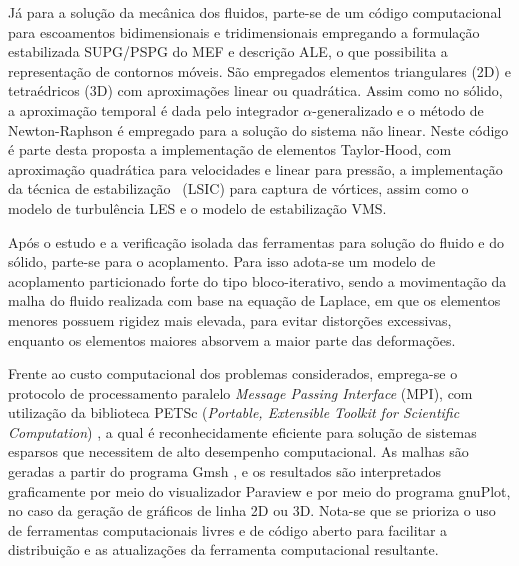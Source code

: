 Já para a solução da mecânica dos fluidos, parte-se de um código computacional para escoamentos bidimensionais e tridimensionais empregando a formulação estabilizada SUPG/PSPG do MEF e descrição ALE, o que possibilita a representação de contornos móveis. São empregados elementos triangulares (2D) e tetraédricos (3D) com aproximações linear ou quadrática. Assim como no sólido, a aproximação temporal é dada pelo integrador $\alpha$-generalizado e o método de Newton-Raphson é empregado para a solução do sistema não linear. Neste código é parte desta proposta a implementação de elementos Taylor-Hood, com aproximação quadrática para velocidades e linear para pressão, a implementação da técnica de estabilização \LSIC\ (LSIC) para captura de vórtices, assim como o modelo de turbulência LES e o modelo de estabilização VMS.

Após o estudo e a verificação isolada das ferramentas para solução do fluido e do sólido, parte-se para o acoplamento. Para isso adota-se um modelo de acoplamento particionado forte do tipo bloco-iterativo, sendo a movimentação da malha do fluido realizada com base na equação de Laplace, em que os elementos menores possuem rigidez mais elevada, para evitar distorções excessivas, enquanto os elementos maiores absorvem a maior parte das deformações.

Frente ao custo computacional dos problemas considerados, emprega-se o protocolo de processamento paralelo \textit{Message Passing Interface} (MPI), com utilização da biblioteca PETSc (\textit{Portable, Extensible Toolkit for Scientific Computation}) \cite{petsc-web-page}, a qual é reconhecidamente eficiente para solução de sistemas esparsos que necessitem de alto desempenho computacional. As malhas são geradas a partir do programa Gmsh \cite{geuzaine2009gmsh}, e os resultados são interpretados graficamente por meio do visualizador Paraview \cite{ahrens2005paraview} e por meio do programa gnuPlot, no caso da geração de gráficos de linha 2D ou 3D. Nota-se que se prioriza o uso de ferramentas computacionais livres e de código aberto para facilitar a distribuição e as atualizações da ferramenta computacional resultante.
